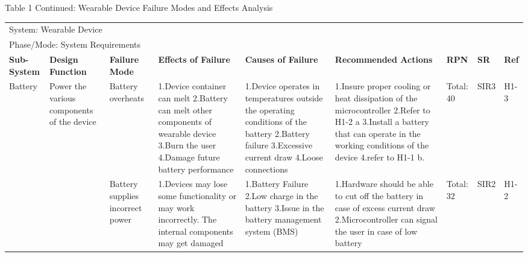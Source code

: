 \documentclass[12pt, titlepage]{article}
\begin{document}
\begin{landscape}
\begin{table}[H]
    \centering
        Table 1 Continued: Wearable Device Failure Modes and Effects Analysis

        \begin{tabular}{| p{} | p{}  | p{} | p{} | p{} | p{} | p{} | p{} | p{} |}
        \hline
        
        \multicolumn{9}{|l|}{System: Wearable Device} \\
        \multicolumn{9}{|l|}{Phase/Mode: System Requirements} \\ \hline
        \textbf{Sub-System} & \textbf{Design Function} & \textbf{Failure Mode} & \textbf{Effects of Failure} & \textbf{Causes of Failure} & \textbf{Recommended Actions} & \textbf{RPN} & \textbf{SR} & \textbf{Ref} \\ \hline
    
        Battery & Power the various components of the device  &  Battery overheats & 1.Device container can melt \newline 2.Battery can melt other components of wearable device \newline 3.Burn the user \newline 4.Damage future battery performance & 1.Device operates in temperatures outside the operating conditions of the battery \newline 2.Battery failure \newline 3.Excessive current draw \newline 4.Loose connections  & 1.Insure proper cooling or heat dissipation of the microcontroller \newline 2.Refer to H1-2 a \newline 3.Install a battery that can operate in the working conditions of the device \newline 4.refer to H1-1 b. & Total: 40 & SIR3 & H1-3 \\ \hline
 
        & & Battery supplies incorrect power & 1.Devices may lose some functionality or may work incorrectly. The internal components may get damaged & 1.Battery Failure \newline 2.Low charge in the battery \newline 3.Issue in the battery management system (BMS) & 1.Hardware should be able to cut off the battery in case of excess current draw \newline 2.Microcontroller can signal the user in case of low battery & Total: 32 & SIR2 & H1-2 \\ \cline{1-9}
 

\end{tabular}
\end{table}
\end{landscape}
\end{document}
